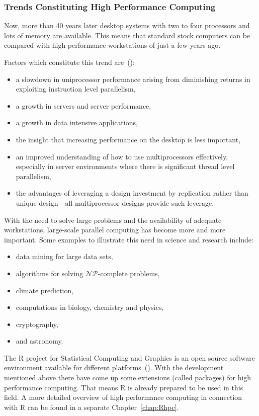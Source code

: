 \subsubsection{Trends Constituting High Performance Computing}
Now, more than 40 years later desktop systems with two to four
processors and lots of memory are available. This means that standard
stock computers can be compared with high performance workstations of
just a few years ago.

Factors which constitute this trend are~(\cite{C1quant07}):
\begin{itemize}
\item a slowdown in uniprocessor performance arising from diminishing
  returns in exploiting instruction level parallelism,
\item a growth in servers and server performance,
\item a growth in data intensive applications,
\item the insight that increasing performance on the desktop is less
  important,
\item an improved understanding of how to use multiprocessors
  effectively, especially in server environments where there is
  significant thread level parallelism,
\item the advantages of leveraging a design investment by replication
  rather than unique design---all multiprocessor designs provide such leverage.
\end{itemize}

With the need to solve large problems and the availability of adequate
workstations, large-scale parallel computing has become more and more
important. Some examples to illustrate this need in science and
research include:

\begin{itemize}
\item data mining for large data sets,
\item algorithms for solving $\mathcal{NP}$-complete problems,
\item climate prediction,
\item computations in biology, chemistry and physics,
\item cryptography,
\item and astronomy.
\end{itemize}

The R project for Statistical Computing and Graphics is an open source
software environment available for different
platforms~(\cite{Rcore07R}). With the 
development mentioned above there have come up some extensions (called
packages) for high performance computing. That means R is already
prepared to be used in this field. A more detailed overview of high
performance computing in connection with R can be found in a separate
Chapter~\ref{chap:Rhpc}.


